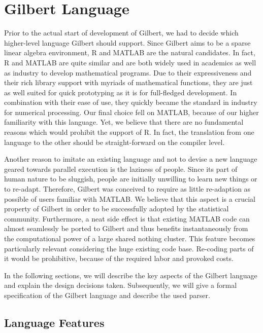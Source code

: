 \chapter{Gilbert Language}
\label{cha:gilbertlanguage}


Prior to the actual start of development of Gilbert, we had to decide which higher-level language Gilbert should support.
Since Gilbert aims to be a sparse linear algebra environment, R and MATLAB are the natural candidates.
In fact, R and MATLAB are quite similar and are both widely used in academics as well as industry to develop mathematical programs.
Due to their expressiveness and their rich library support with myriads of mathematical functions, they are just as well suited for quick prototyping as it is for full-fledged development.
In combination with their ease of use, they quickly became the standard in industry for numerical processing.
Our final choice fell on MATLAB, because of our higher familiarity with this language.
Yet, we believe that there are no fundamental reasons which would prohibit the support of R.
In fact, the translation from one language to the other should be straight-forward on the compiler level.

Another reason to imitate an existing language and not to devise a new language geared towards parallel execution is the laziness of people.
Since its part of human nature to be sluggish, people are initially unwilling to learn new things or to re-adapt.
Therefore, Gilbert was conceived to require as little re-adaption as possible of users familiar with MATLAB.
We believe that this aspect is a crucial property of Gilbert in order to be successfully adopted by the statistical community.
Furthermore, a neat side effect is that existing MATLAB code can almost seamlessly be ported to Gilbert and thus benefits instantaneously from the computational power of a large shared nothing cluster.
This feature becomes particularly relevant considering the huge existing code base.
Re-coding parts of it would be prohibitive, because of the required labor and provoked costs.

In the following sections, we will describe the key aspects of the Gilbert language and explain the design decisions taken.
Subsequently, we will give a formal specification of the Gilbert language and describe the used parser.

\section{Language Features}
\label{sec:languageFeatures}


